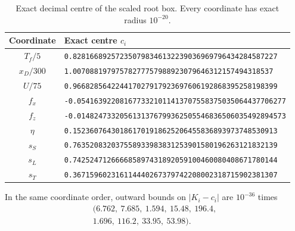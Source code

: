 \begin{table}[htbp]\centering\caption{Exact decimal centre of the scaled root box. Every coordinate has exact radius $10^{-20}$.}\label{tab:rootbox}
{\footnotesize\begin{tabular}{cl}\toprule
Coordinate & Exact centre $c_i$\\\midrule
$T_f/5$ & \texttt{0.828166892572350798346132239036969796434284587227}\\
$x_D/300$ & \texttt{1.00708819797578277757988923079646312157494318537}\\
$U/75$ & \texttt{0.966828564224417027917923697606192868395258198399}\\
$f_x$ & \texttt{-0.0541639220816773321011413707558375035064437706277}\\
$f_z$ & \texttt{-0.0148247332056131376799362505546836506035492894573}\\
$\eta$ & \texttt{0.152360764301861701918625206455836893973748530913}\\
$s_S$ & \texttt{0.763520832037558933983831253901580196263121832139}\\
$s_L$ & \texttt{0.742524712666685897431892059100460080408671780144}\\
$s_T$ & \texttt{0.367159602316114440267379742208002318715902381307}\\
\bottomrule\end{tabular}}\end{table}
In the same coordinate order, outward bounds on $|K_i-c_i|$ are $10^{-36}$ times
\[
\begin{gathered}
(6.762,\ 7.685,\ 1.594,\ 15.48,\ 196.4,\\
1.696,\ 116.2,\ 33.95,\ 53.98).
\end{gathered}
\]
